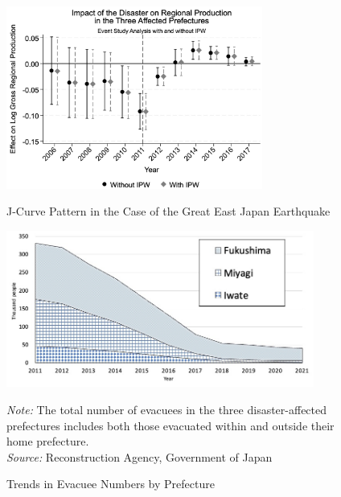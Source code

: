 \documentclass[a4paper,12pt]{article}
\begin{document}
\begin{figure}[htbp]
    \centering
    \caption{J-Curve Pattern in the Case of the Great East Japan Earthquake}
    \label{fig:jcurve}
    \includegraphics[width=0.75\textwidth]{event_study_results.jpeg}
    \label{fig:event_study_results}
\end{figure}




\begin{figure}[h!]
  \centering
  \includegraphics[width=0.9\textwidth]{number_of_evacuees.jpg}
  \footnotesize
  \begin{minipage}{0.9\textwidth}
      \textit{Note:} The total number of evacuees in the three disaster-affected prefectures includes both those evacuated within and outside their home prefecture.\\
      \textit{Source:} Reconstruction Agency, Government of Japan
  \end{minipage}
  \caption{Trends in Evacuee Numbers by Prefecture}
  \label{fig:number_of_evacuees}
\end{figure}

\end{document}
